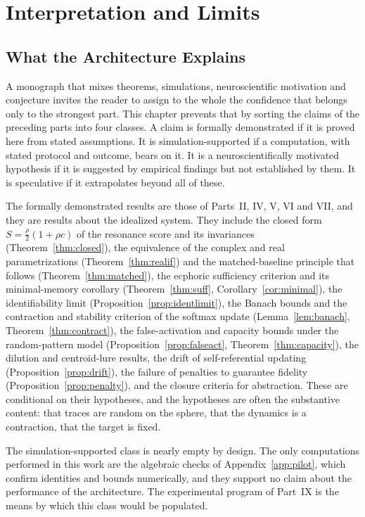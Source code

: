 \part{Interpretation and Limits}

\chapter{What the Architecture Explains}\label{ch:explains}

A monograph that mixes theorems, simulations, neuroscientific motivation and conjecture invites the reader to assign to the whole the confidence that belongs only to the strongest part. This chapter prevents that by sorting the claims of the preceding parts into four classes. A claim is formally demonstrated if it is proved here from stated assumptions. It is simulation-supported if a computation, with stated protocol and outcome, bears on it. It is a neuroscientifically motivated hypothesis if it is suggested by empirical findings but not established by them. It is speculative if it extrapolates beyond all of these.

The formally demonstrated results are those of Parts~II, IV, V, VI and VII, and they are results about the idealized system. They include the closed form $S=\tfrac\rho2(1+\rho c)$ of the resonance score and its invariances (Theorem~\ref{thm:closed}), the equivalence of the complex and real parametrizations (Theorem~\ref{thm:realif}) and the matched-baseline principle that follows (Theorem~\ref{thm:matched}), the ecphoric sufficiency criterion and its minimal-memory corollary (Theorem~\ref{thm:suff}, Corollary~\ref{cor:minimal}), the identifiability limit (Proposition~\ref{prop:identlimit}), the Banach bounds and the contraction and stability criterion of the softmax update (Lemma~\ref{lem:banach}, Theorem~\ref{thm:contract}), the false-activation and capacity bounds under the random-pattern model (Proposition~\ref{prop:falseact}, Theorem~\ref{thm:capacity}), the dilution and centroid-lure results, the drift of self-referential updating (Proposition~\ref{prop:drift}), the failure of penalties to guarantee fidelity (Proposition~\ref{prop:penalty}), and the closure criteria for abstraction. These are conditional on their hypotheses, and the hypotheses are often the substantive content: that traces are random on the sphere, that the dynamics is a contraction, that the target is fixed.

The simulation-supported class is nearly empty by design. The only computations performed in this work are the algebraic checks of Appendix~\ref{app:pilot}, which confirm identities and bounds numerically, and they support no claim about the performance of the architecture. The experimental program of Part~IX is the means by which this class would be populated.

